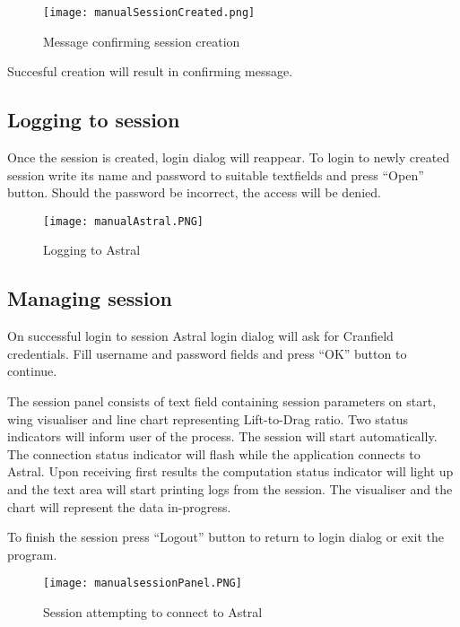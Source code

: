 \documentclass[a4paper,12pt]{article}
\begin{document}
\begin{figure}[h!]
\centering
\texttt{[image: manualSessionCreated.png]}\\
\caption{Message confirming session creation}
\end{figure}

Succesful creation will result in confirming message.

\subsection{Logging to session}

Once the session is created, login dialog will reappear. To login to newly created session write its name and password to suitable textfields and press ``Open'' button. Should the password be incorrect, the access will be denied.

\begin{figure}[h!]
\centering
\texttt{[image: manualAstral.PNG]}\\
\caption{Logging to Astral}
\end{figure}

\subsection{Managing session}

On successful login to session Astral login dialog will ask for Cranfield credentials. Fill username and password fields and press ``OK'' button to continue.

The session panel consists of text field containing session parameters on start, wing visualiser and line chart representing Lift-to-Drag ratio. Two status indicators will inform user of the process. The session will start automatically. The connection status indicator will flash while the application connects to Astral. Upon receiving first results the computation status indicator will light up and the text area will start printing logs from the session. The visualiser and the chart will represent the data in-progress.

To finish the session press ``Logout'' button to return to login dialog or exit the program.

\begin{figure}[h!]
\centering
\texttt{[image: manualsessionPanel.PNG]}\\
\caption{Session attempting to connect to Astral}
\end{figure}
\end{document}
